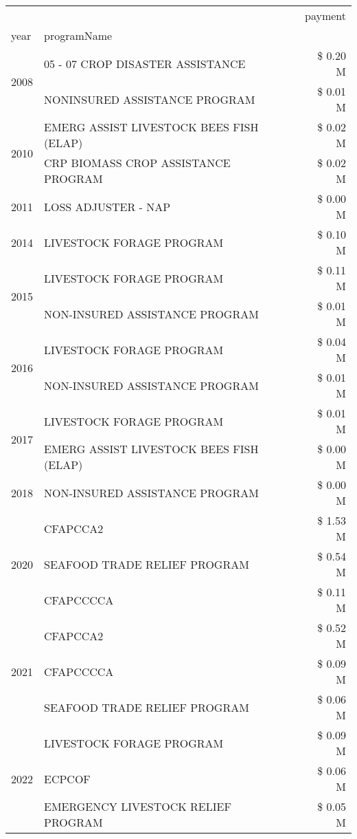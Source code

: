 \begin{tabular}{llr}
\toprule
 &  & payment \\
year & programName &  \\
\midrule
\multirow[t]{2}{*}{2008} & 05 - 07 CROP DISASTER ASSISTANCE & \$ 0.20 M \\
 & NONINSURED ASSISTANCE PROGRAM & \$ 0.01 M \\
\cline{1-3}
\multirow[t]{2}{*}{2010} & EMERG ASSIST LIVESTOCK BEES FISH (ELAP) & \$ 0.02 M \\
 & CRP BIOMASS CROP ASSISTANCE PROGRAM & \$ 0.02 M \\
\cline{1-3}
2011 & LOSS ADJUSTER - NAP & \$ 0.00 M \\
\cline{1-3}
2014 & LIVESTOCK FORAGE PROGRAM & \$ 0.10 M \\
\cline{1-3}
\multirow[t]{2}{*}{2015} & LIVESTOCK FORAGE PROGRAM & \$ 0.11 M \\
 & NON-INSURED ASSISTANCE PROGRAM & \$ 0.01 M \\
\cline{1-3}
\multirow[t]{2}{*}{2016} & LIVESTOCK FORAGE PROGRAM & \$ 0.04 M \\
 & NON-INSURED ASSISTANCE PROGRAM & \$ 0.01 M \\
\cline{1-3}
\multirow[t]{2}{*}{2017} & LIVESTOCK FORAGE PROGRAM & \$ 0.01 M \\
 & EMERG ASSIST LIVESTOCK BEES FISH (ELAP) & \$ 0.00 M \\
\cline{1-3}
2018 & NON-INSURED ASSISTANCE PROGRAM & \$ 0.00 M \\
\cline{1-3}
\multirow[t]{3}{*}{2020} & CFAPCCA2 & \$ 1.53 M \\
 & SEAFOOD TRADE RELIEF PROGRAM & \$ 0.54 M \\
 & CFAPCCCCA & \$ 0.11 M \\
\cline{1-3}
\multirow[t]{3}{*}{2021} & CFAPCCA2 & \$ 0.52 M \\
 & CFAPCCCCA & \$ 0.09 M \\
 & SEAFOOD TRADE RELIEF PROGRAM & \$ 0.06 M \\
\cline{1-3}
\multirow[t]{3}{*}{2022} & LIVESTOCK FORAGE PROGRAM & \$ 0.09 M \\
 & ECPCOF & \$ 0.06 M \\
 & EMERGENCY LIVESTOCK RELIEF PROGRAM & \$ 0.05 M \\
\cline{1-3}
\bottomrule
\end{tabular}
